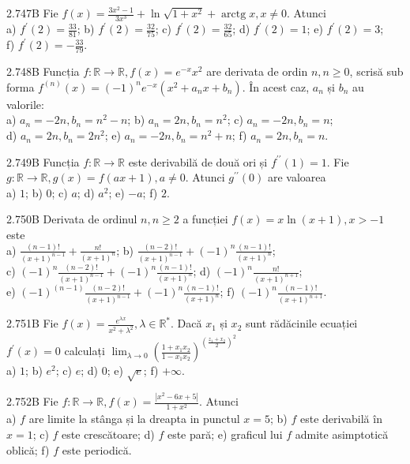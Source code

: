 \documentclass[11pt]{article}
\begin{document}
2.747B Fie $f(x)=\frac{3 x^{2}-1}{3 x^{3}}+\ln \sqrt{1+x^{2}}+\operatorname{arctg} x, x \neq 0$. Atunci\\ a) $f^{\prime}(2)=\frac{33}{81}$; b) $f^{\prime}(2)=\frac{32}{75}$; c) $f^{\prime}(2)=\frac{32}{65}$; d) $f^{\prime}(2)=1$; e) $f^{\prime}(2)=3$;\\ f) $f^{\prime}(2)=-\frac{33}{79}$.

2.748B Funcția $f: \mathbb{R} \rightarrow \mathbb{R}, f(x)=e^{-x} x^{2}$ are derivata de ordin $n, n \geq 0$, scrisă sub forma $f^{(n)}(x)=(-1)^{n} e^{-x}\left(x^{2}+a_{n} x+b_{n}\right)$. În acest caz, $a_{n}$ și $b_{n}$ au valorile:\\ a) $a_{n}=-2 n, b_{n}=n^{2}-n$; b) $a_{n}=2 n, b_{n}=n^{2}$; c) $a_{n}=-2 n, b_{n}=n$;\\ d) $a_{n}=2 n, b_{n}=2 n^{2}$; e) $a_{n}=-2 n, b_{n}=n^{2}+n$; f) $a_{n}=2 n, b_{n}=n$.

2.749B Funcția $f: \mathbb{R} \rightarrow \mathbb{R}$ este derivabilă de două ori și $f^{\prime \prime}(1)=1$. Fie $g: \mathbb{R} \rightarrow \mathbb{R}, g(x)=f(a x+1), a \neq 0$. Atunci $g^{\prime \prime}(0)$ are valoarea\\ a) $1$; b) $0$; c) $a$; d) $a^{2}$; e) $-a$; f) $2$.

2.750B Derivata de ordinul $n, n \geq 2$ a funcției $f(x)=x \ln (x+1), x>-1$ este\\ a) $\frac{(n-1)!}{(x+1)^{n-1}}+\frac{n!}{(x+1)^{n}}$; b) $\frac{(n-2)!}{(x+1)^{n-1}}+(-1)^{n} \frac{(n-1)!}{(x+1)^{n}}$;\\ c) $(-1)^{n} \frac{(n-2)!}{(x+1)^{n-1}}+(-1)^{n} \frac{(n-1)!}{(x+1)^{n}}$; d) $(-1)^{n} \frac{n!}{(x+1)^{n+1}}$;\\ e) $(-1)^{(n-1)} \frac{(n-2)!}{(x+1)^{n-1}}+(-1)^{n} \frac{(n-1)!}{(x+1)^{n}}$; f) $(-1)^{n} \frac{(n-1)!}{(x+1)^{n+1}}$.

2.751B Fie $f(x)=\frac{e^{\lambda x}}{x^{2}+\lambda^{2}}, \lambda \in \mathbb{R}^{*}$. Dacă $x_{1}$ și $x_{2}$ sunt rădăcinile ecuației $f^{\prime}(x)=0$ calculați $\lim _{\lambda \rightarrow 0}\left(\frac{1+x_{1} x_{2}}{1-x_{1} x_{2}}\right)^{\left(\frac{z_{1}+x_{2}}{2}\right)^{2}}$\\ a) $1$; b) $e^{2}$; c) $e$; d) $0$; e) $\sqrt{e}$; f) $+\infty$.

2.752B Fie $f: \mathbb{R} \rightarrow \mathbb{R}, f(x)=\frac{\left|x^{2}-6 x+5\right|}{1+x^{2}}$. Atunci\\ a) $f$ are limite la stânga și la dreapta in punctul $x=5$; b) $f$ este derivabilă în $x=1$; c) $f$ este crescătoare; d) $f$ este pară; e) graficul lui $f$ admite asimptotică oblică; f) $f$ este periodică.
\end{document}
